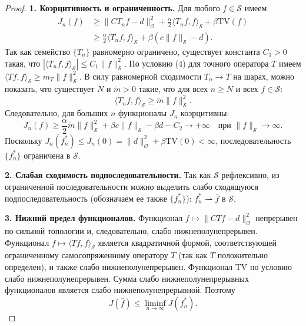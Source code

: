 \documentclass[a4paper,14pt,oneside,openany]{extarticle}
\begin{document}
\begin{proof}
\textbf{1. Коэрцитивность и ограниченность.}
Для любого $f \in \mathcal{S}$ имеем
\begin{align*}
    J_n(f) &\ge \|C T_n f - d\|_{\mathcal{O}}^2 + \frac{\alpha}{2} \langle T_n f, f\rangle_{\mathcal{S}} + \beta \mathrm{TV}(f) \\
    &\ge \frac{\alpha}{2} \langle T_n f, f\rangle_{\mathcal{S}} + \beta (c \|f\|_{\mathcal{S}} - d).
\end{align*}
Так как семейство $\{T_n\}$ равномерно ограничено, существует константа 
$C_1>0$ такая, что $|\langle T_n f, f\rangle_{\mathcal{S}}| \le C_1 \|f\|_{\mathcal{S}}^2$.
По условию (4) для точного оператора $T$ имеем $\langle T f, 
f\rangle_{\mathcal{S}} \ge m_T \|f\|_{\mathcal{S}}^2$.
В силу равномерной сходимости $T_n \to T$ на шарах, можно показать, что существует $N$ и 
$\tilde{m}>0$ такие, что для всех $n \ge N$ и всех $f \in \mathcal{S}$:
\begin{equation}
    \langle T_n f, f\rangle_{\mathcal{S}} \ge \tilde{m} \|f\|_{\mathcal{S}}^2.
\end{equation}
Следовательно, для больших $n$ функционалы $J_n$ коэрцитивны:
\begin{equation}
    J_n(f) \ge \frac{\alpha}{2} \tilde{m} \|f\|_{\mathcal{S}}^2 + \beta c \|f\|_{\mathcal{S}} - 
    \beta d - C_2 \to +\infty \quad \text{при } \|f\|_{\mathcal{S}} \to \infty.
\end{equation}
Поскольку $J_n(f_n^*) \le J_n(0) = \|d\|_{\mathcal{O}}^2 + \beta \mathrm{TV}(0) < \infty$, 
последовательность $\{f_n^*\}$ ограничена в $\mathcal{S}$.

\textbf{2. Слабая сходимость подпоследовательности.}
Так как $\mathcal{S}$ рефлексивно, из ограниченной последовательности можно выделить слабо 
сходящуюся подпоследовательность (обозначаем ее также $\{f_n^*\}$): $f_n^* \rightharpoonup 
\bar f$ в $\mathcal{S}$.

\textbf{3. Нижний предел функционалов.}
Функционал $f \mapsto \|C T f - d\|_{\mathcal{O}}^2$ непрерывен по сильной топологии и, 
следовательно, слабо нижнеполунепрерывен.
Функционал $f \mapsto \langle T f, f\rangle_{\mathcal{S}}$ является квадратичной формой, 
соответствующей ограниченному самосопряженному оператору $T$ (так как $T$ положительно определен), 
и также слабо нижнеполунепрерывен.
Функционал $\mathrm{TV}$ по условию слабо нижнеполунепрерывен.
Сумма слабо нижнеполунепрерывных функционалов является слабо нижнеполунепрерывной. Поэтому
\begin{equation}
    J(\bar f) \le \liminf_{n\to\infty} J(f_n^*).
\end{equation}


\end{proof}
\end{document}
